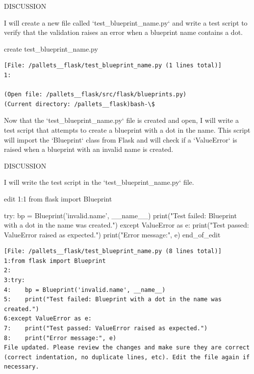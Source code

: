 {\begin{agentbox}
DISCUSSION

I will create a new file called `test\_blueprint\_name.py` and write a test script to verify that the validation raises an error when a blueprint name contains a dot.



\hrulefill
\begin{CodeVerbatim}[breaklines=true, breakanywhere=true]
create test_blueprint_name.py
\end{CodeVerbatim}
\end{agentbox}
\begin{observationbox}\begin{Verbatim}[breaklines=true, breakanywhere=true]
[File: /pallets__flask/test_blueprint_name.py (1 lines total)]
1:

(Open file: /pallets__flask/src/flask/blueprints.py)
(Current directory: /pallets__flask)bash-\$
\end{Verbatim}
\end{observationbox}
\begin{agentbox}
Now that the `test\_blueprint\_name.py` file is created and open, I will write a test script that attempts to create a blueprint with a dot in the name. This script will import the `Blueprint` class from Flask and will check if a `ValueError` is raised when a blueprint with an invalid name is created.



DISCUSSION

I will write the test script in the `test\_blueprint\_name.py` file.



\hrulefill
\begin{CodeVerbatim}[breaklines=true, breakanywhere=true]
edit 1:1
from flask import Blueprint

try:
    bp = Blueprint('invalid.name', __name__)
    print("Test failed: Blueprint with a dot in the name was created.")
except ValueError as e:
    print("Test passed: ValueError raised as expected.")
    print("Error message:", e)
end_of_edit
\end{CodeVerbatim}
\end{agentbox}
\begin{observationbox}\begin{Verbatim}[breaklines=true, breakanywhere=true]
[File: /pallets__flask/test_blueprint_name.py (8 lines total)]
1:from flask import Blueprint
2:
3:try:
4:    bp = Blueprint('invalid.name', __name__)
5:    print("Test failed: Blueprint with a dot in the name was created.")
6:except ValueError as e:
7:    print("Test passed: ValueError raised as expected.")
8:    print("Error message:", e)
File updated. Please review the changes and make sure they are correct (correct indentation, no duplicate lines, etc). Edit the file again if necessary.


\end{Verbatim}
\end{observationbox}}
